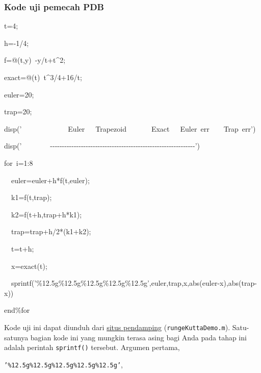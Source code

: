 \subsubsection{Kode uji pemecah PDB}
\begin{lyxcode}
t=4;

h=-1/4;

f=@(t,y)~-y/t+t\textasciicircum 2;

exact=@(t)~t\textasciicircum 3/4+16/t;

euler=20;

trap=20;

disp('~~~~~~~~~~~~~Euler~~~Trapezoid~~~~~~~Exact~~~Euler~err~~~~Trap~err')

disp('~~~~~~~~-{}-{}-{}-{}-{}-{}-{}-{}-{}-{}-{}-{}-{}-{}-{}-{}-{}-{}-{}-{}-{}-{}-{}-{}-{}-{}-{}-{}-{}-{}-{}-{}-{}-{}-{}-{}-{}-{}-{}-{}-{}-{}-{}-{}-{}-{}-{}-{}-{}-{}-{}-{}-{}-{}-{}-{}-{}-{}-{}-{}-')

for~i=1:8

~~euler=euler+h{*}f(t,euler);

~~k1=f(t,trap);

~~k2=f(t+h,trap+h{*}k1);

~~trap=trap+h/2{*}(k1+k2);

~~t=t+h;

~~x=exact(t);

~~sprintf('\%12.5g\%12.5g\%12.5g\%12.5g\%12.5g',euler,trap,x,abs(euler-x),abs(trap-x))

end\%for
\end{lyxcode}
Kode uji ini dapat diunduh dari \href{http://lqbrin.github.io/tea-time-numerical/ancillaries.html}{situs pendamping}
(\texttt{rungeKuttaDemo.m}). Satu-satunya bagian kode ini yang mungkin
terasa asing bagi Anda pada tahap ini adalah perintah \texttt{sprintf()}
tersebut.  Argumen pertama,

\begin{center}
\texttt{'\%12.5g\%12.5g\%12.5g\%12.5g\%12.5g'}, 
\par\end{center}

